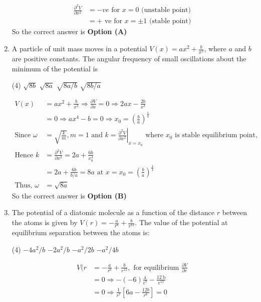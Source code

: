 \begin{enumerate}
\begin{answer}
\begin{align*}
\frac{\partial^{2} V}{\partial x^{2}}&=-v e\text{ for }x=0\text{ (unstable point)}\\
&=+\text{ ve for }x=\pm 1\text{ (stable point)}
\end{align*}
So the correct answer is \textbf{Option (A)}
\end{answer}
\item A particle of unit mass moves in a potential $V(x)=a x^{2}+\frac{b}{x^{2}}$, where $a$ and $b$ are positive constants. The angular frequency of small oscillations about the minimum of the potential is
{}
\begin{tasks}(4)
\task[\textbf{A.}] $\sqrt{8 b}$
\task[\textbf{B.}] $\sqrt{8 a}$
\task[\textbf{C.}] $\sqrt{8 a / b}$
\task[\textbf{D.}] $\sqrt{8 b / a}$
\end{tasks}
\begin{answer}
\begin{align*}
V(x)&=a x^{2}+\frac{b}{x^{2}} \Rightarrow \frac{\partial V}{\partial x}=0 \Rightarrow 2 a x-\frac{2 b}{x^{3}}\\&=0 \Rightarrow a x^{4}-b=0 \Rightarrow x_{0}=\left(\frac{b}{a}\right)^{\frac{1}{4}}\\
\text{Since }\omega&=\sqrt{\frac{k}{m}}, m=1\text{ and }k=\left.\frac{\partial^{2} V}{\partial x^{2}}\right|_{x=x_{0}}\text{ where }x_{0} \text{ is stable equilibrium point,}\\
\text{Hence }k&=\frac{\partial^{2} V}{\partial x^{2}}=2 a+\frac{6 b}{x_{0}^{4}}\\&=2 a+\frac{6 b}{b / a}=8 a\text{ at }x=x_{0}=\left(\frac{b}{a}\right)^{\frac{1}{4}}\\
\text{Thus, }\omega&=\sqrt{8 a}
\end{align*}
So the correct answer is \textbf{Option (B)}
\end{answer}
\item The potential of a diatomic molecule as a function of the distance $r$ between the atoms is given by $V(r)=-\frac{a}{r^{6}}+\frac{b}{r^{12}} .$ The value of the potential at equilibrium separation between the atoms is:
{}
\begin{tasks}(4)
\task[\textbf{A.}] $-4 a^{2} / b$
\task[\textbf{B.}] $-2 a^{2} / b$
\task[\textbf{C.}] $-a^{2} / 2 b$
\task[\textbf{D.}] $-a^{2} / 4 b$
\end{tasks}
\begin{answer}
\begin{align*}
V(r&=-\frac{a}{r^{6}}+\frac{b}{r^{12}},\text{ for equilibrium }\frac{\partial V}{\partial r}\\&=0 \Rightarrow-(-6) \frac{\mathrm{a}}{\mathrm{r}^{7}}-\frac{12 \mathrm{~b}}{\mathrm{r}^{13}}\\&=0 \Rightarrow \frac{1}{r^{7}}\left[6 a-\frac{12 b}{r^{6}}\right]=0\\

\end{align*}
\end{answer}
\end{enumerate}
